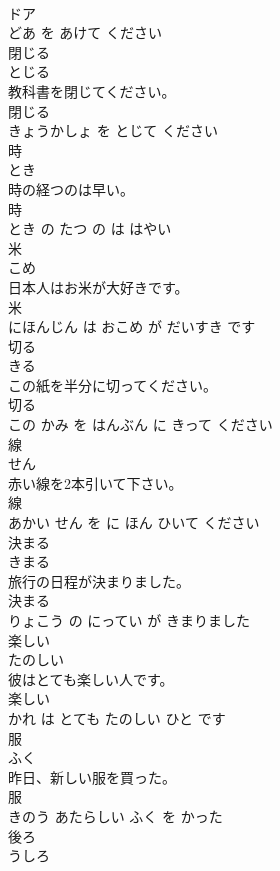 \documentclass[8pt]{extreport}
\begin{document}
\begin{CJK}{UTF8}{min}
\\	ドア 
\\	どあ を あけて ください			
\\	閉じる	
\\	とじる			
\\	教科書を閉じてください。	
\\	閉じる 
\\	きょうかしょ を とじて ください			
\\	時	
\\	とき			
\\	時の経つのは早い。	
\\	時 
\\	とき の たつ の は はやい			
\\	米	
\\	こめ			
\\	日本人はお米が大好きです。	
\\	米 
\\	にほんじん は おこめ が だいすき です			
\\	切る	
\\	きる			
\\	この紙を半分に切ってください。	
\\	切る 
\\	この かみ を はんぶん に きって ください			
\\	線	
\\	せん			
\\	赤い線を2本引いて下さい。	
\\	線 
\\	あかい せん を に ほん ひいて ください			
\\	決まる	
\\	きまる			
\\	旅行の日程が決まりました。	
\\	決まる 
\\	りょこう の にってい が きまりました			
\\	楽しい	
\\	たのしい			
\\	彼はとても楽しい人です。	
\\	楽しい 
\\	かれ は とても たのしい ひと です			
\\	服	
\\	ふく			
\\	昨日、新しい服を買った。	
\\	服 
\\	きのう あたらしい ふく を かった			
\\	後ろ	
\\	うしろ			

\end{CJK}
\end{document}
